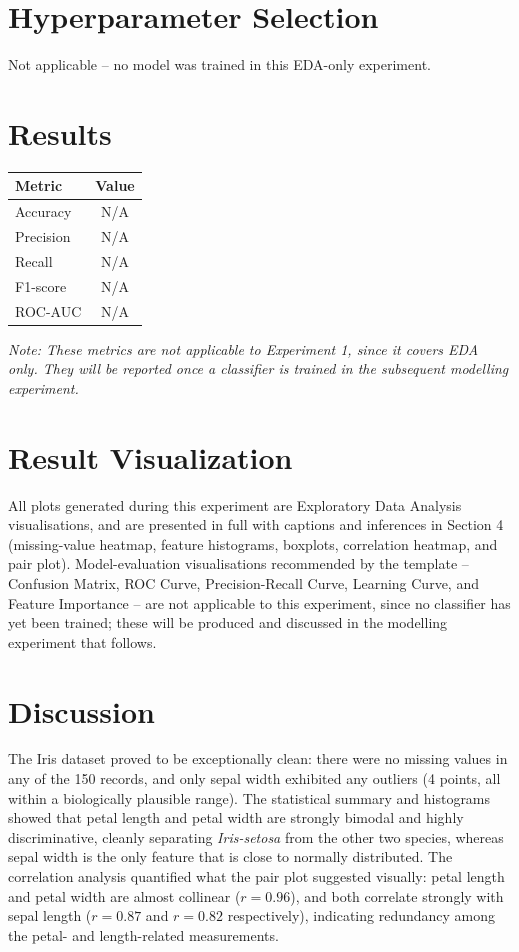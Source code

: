 \documentclass[12pt,a4paper]{article}
\begin{document}
\section{Hyperparameter Selection}
Not applicable -- no model was trained in this EDA-only experiment.

\section{Results}
\begin{tabular}{lc}
\toprule
Metric & Value\\
\midrule
Accuracy & N/A \\
Precision & N/A \\
Recall & N/A \\
F1-score & N/A \\
ROC-AUC & N/A \\
\bottomrule
\end{tabular}

\textit{Note: These metrics are not applicable to Experiment 1, since it covers EDA only. They will be reported once a classifier is trained in the subsequent modelling experiment.}

\section{Result Visualization}
All plots generated during this experiment are Exploratory Data Analysis visualisations, and are presented in full with captions and inferences in Section 4 (missing-value heatmap, feature histograms, boxplots, correlation heatmap, and pair plot). Model-evaluation visualisations recommended by the template -- Confusion Matrix, ROC Curve, Precision-Recall Curve, Learning Curve, and Feature Importance -- are not applicable to this experiment, since no classifier has yet been trained; these will be produced and discussed in the modelling experiment that follows.

\section{Discussion}
The Iris dataset proved to be exceptionally clean: there were no missing values in any of the 150 records, and only sepal width exhibited any outliers (4 points, all within a biologically plausible range). The statistical summary and histograms showed that petal length and petal width are strongly bimodal and highly discriminative, cleanly separating \textit{Iris-setosa} from the other two species, whereas sepal width is the only feature that is close to normally distributed. The correlation analysis quantified what the pair plot suggested visually: petal length and petal width are almost collinear ($r=0.96$), and both correlate strongly with sepal length ($r=0.87$ and $r=0.82$ respectively), indicating redundancy among the petal- and length-related measurements.
\end{document}
